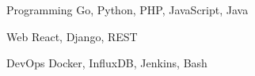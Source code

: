

\begin{cvskills}

  \cvskill
    {Programming} %
    {Go, Python, PHP, JavaScript, Java} %

  \cvskill
    {Web} %
    {React, Django, REST} %
    
  \cvskill
    {DevOps}
    {Docker, InfluxDB, Jenkins, Bash}


\end{cvskills}
